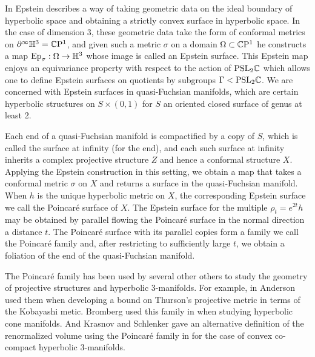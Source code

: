 In \cite{epstein1984} Epstein describes a way of taking geometric data on the ideal boundary of hyperbolic space and obtaining a strictly convex surface in hyperbolic space. 
In the case of dimension 3, these geometric data take the form of conformal metrics on $\partial^\infty \mathbb{H}^3 = \mathbb{C}\mathrm{P}^1$, and given such a metric $\sigma$ on a domain $\Omega \subset \mathbb{C}\mathrm{P}^1$ he constructs a map $\mathrm{Ep}_\sigma: \Omega \to \mathbb{H}^3$ whose image is called an Epstein surface.
This Epstein map enjoys an equivariance property with respect to the action of $\mathrm{PSL}_2\mathbb{C}$ which allows one to define Epstein surfaces on quotients by subgroups $\Gamma < \mathrm{PSL}_2\mathbb{C}$.
We are concerned with Epstein surfaces in quasi-Fuchsian manifolds, which are certain hyperbolic structures on $S \times (0,1)$ for $S$ an oriented closed surface of genus at least 2. 

Each end of a quasi-Fuchsian manifold is compactified by a copy of $S$, which is called the surface at infinity (for the end), and each such surface at infinity inherits a complex projective structure $Z$ and hence a conformal structure $X$. 
Applying the Epstein construction in this setting, we obtain a map that takes a conformal metric $\sigma$ on $X$ and returns a surface in the quasi-Fuchsian manifold.
When $h$ is the unique hyperbolic metric on $X$, the corresponding Epstein surface we call the Poincar\'e surface of $X$. 
The Epstein surface for the multiple $\rho_t = e^{2t}h$ may be obtained by parallel flowing the Poincar\'e surface in the normal direction a distance $t$. 
The Poincar\'e surface with its parallel copies form a family we call the Poincar\'e family and, after restricting to sufficiently large $t$, we obtain a foliation of the end of the quasi-Fuchsian manifold. 

The Poincar\'e family has been used by several other others to study the geometry of projective structures and hyperbolic 3-manifolds. 
For example, in \cite{anderson1998} Anderson used them when developing a bound on Thurson's projective metric in terms of the Kobayashi metic. 
Bromberg used this family in \cite{bromberg2004} when studying hyperbolic cone manifolds. 
And Krasnov and Schlenker gave an alternative definition of the renormalized volume using the Poincar\'e family in \cite{krasnov-schlenker2008} for the case of convex co-compact hyperbolic 3-manifolds. 


